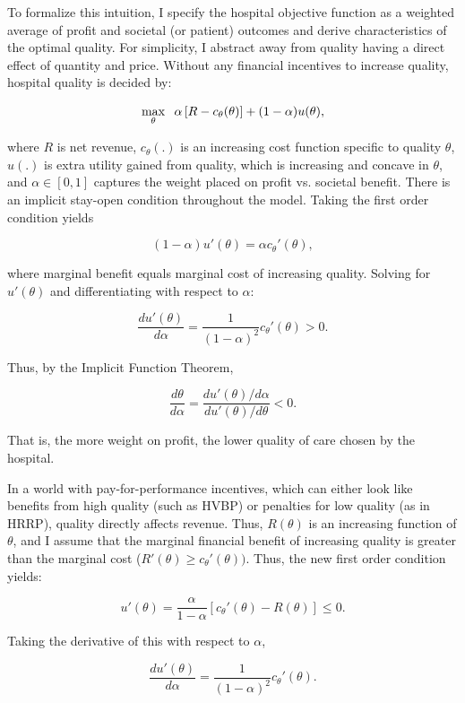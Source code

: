 \documentclass[12pt]{article}
\begin{document}
    To formalize this intuition, I specify the hospital objective function as a weighted average of profit and societal (or patient) outcomes and derive characteristics of the optimal quality. For simplicity, I abstract away from quality having a direct effect of quantity and price. Without any financial incentives to increase quality, hospital quality is decided by:  
    
    $$\max_{\theta}\hspace{2mm}\alpha\left[R - c_{\theta}(\theta) \right] + (1-\alpha) u(\theta),$$

    \noindent where $R$ is net revenue, $c_{\theta}(.)$ is an increasing cost function specific to quality $\theta$, $u(.)$ is extra utility gained from quality, which is increasing and concave in $\theta$, and $\alpha\in[0,1]$ captures the weight placed on profit vs. societal benefit. There is an implicit stay-open condition throughout the model. Taking the first order condition yields 

    $$(1-\alpha)u'(\theta) = \alpha c_{\theta}'(\theta),$$

    \noindent where marginal benefit equals marginal cost of increasing quality. Solving for $u'(\theta)$ and differentiating with respect to $\alpha$:

    $$\frac{du'(\theta)}{d\alpha} = \frac{1}{(1-\alpha)^2}c_{\theta}'(\theta) > 0.$$

    \noindent Thus, by the Implicit Function Theorem, 

    $$\frac{d\theta}{d\alpha} = \frac{du'(\theta)/d\alpha}{du'(\theta)/d\theta} < 0.$$

    \noindent That is, the more weight on profit, the lower quality of care chosen by the hospital.

    In a world with pay-for-performance incentives, which can either look like benefits from high quality (such as HVBP) or penalties for low quality (as in HRRP), quality directly affects revenue. Thus, $R(\theta)$ is an increasing function of $\theta$, and I assume that the marginal financial benefit of increasing quality is greater than the marginal cost ($R'(\theta)\geq c_{\theta}'(\theta))$. Thus, the new first order condition yields:

    $$u'(\theta) = \frac{\alpha}{1-\alpha} \left[c_{\theta}'(\theta)-R(\theta)\right] \leq 0.$$

    \noindent Taking the derivative of this with respect to $\alpha$,

    $$\frac{du'(\theta)}{d\alpha} = \frac{1}{(1-\alpha)^2}c_{\theta}'(\theta).$$
\end{document}
